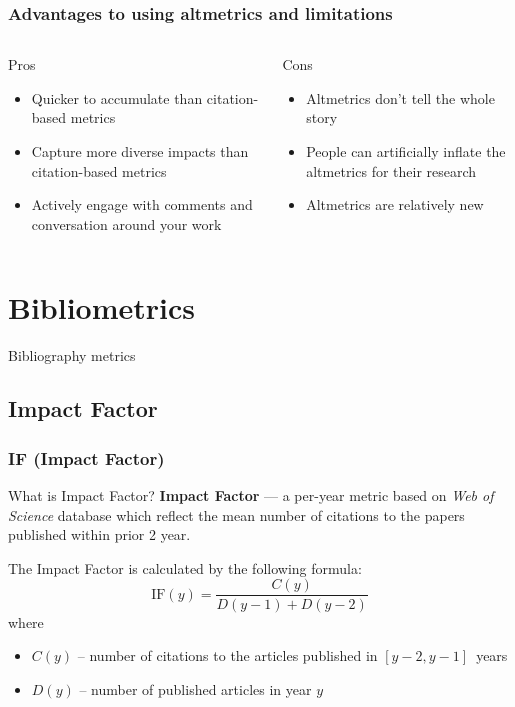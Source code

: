 \documentclass{beamer}
\newcommand{\pros}{\item[{\textcolor[HTML]{3C8031}{\ding{51}}}]}
\newcommand{\cons}{\item[\textcolor{red}{\ding{54}}]}
\newcommand{\wos}{\textit{Web of Science} }
\begin{document}
\begin{frame}
    \frametitle{Advantages to using altmetrics and limitations}
    \begin{columns}[T]
        \begin{column}{.5\textwidth}
            \centering Pros
            \begin{itemize}[<+->]
                \pros Quicker to accumulate than citation-based metrics
                \pros Capture more diverse impacts than citation-based metrics
                \pros Actively engage with comments and conversation around your work
            \end{itemize}
        \end{column}
        \begin{column}{.5\textwidth}
            \centering Cons
            \begin{itemize}[<+->]
                \cons Altmetrics don’t tell the whole story
                \cons People can artificially inflate the altmetrics for their research
                \cons Altmetrics are relatively new
            \end{itemize}
        \end{column}
    \end{columns}
\end{frame}

\section{Bibliometrics}

\begin{frame}
    \centering
    \Huge
    Bibliography metrics
\end{frame}

\subsection{Impact Factor}
\begin{frame}
    \frametitle{IF (Impact Factor)}
    \begin{block}{What is Impact Factor?}
        \textbf{Impact Factor}\cite{garfield1972citation} --- a per-year
        metric based on \wos database which reflect the mean number of citations
        to the papers published within prior 2 year.
    \end{block}

    The Impact Factor is calculated by the following formula:
    \[
        \text{IF}(y) = \frac{C(y)}{D(y - 1) + D(y - 2)}
    \]
    where
    \begin{itemize}
        \item $C(y)$ -- number of citations to the articles published in $[y-2, y-1]$~years
        \item $D(y)$ -- number of published articles in year $y$
    \end{itemize}
\end{frame}
\end{document}
